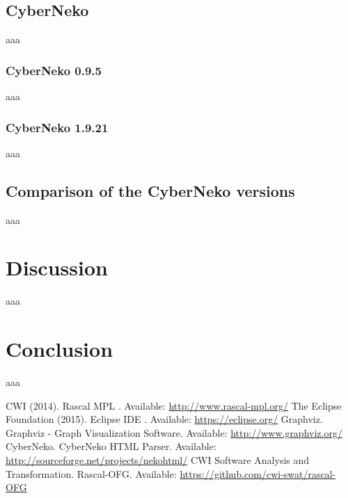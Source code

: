 \documentclass[a4paper,twoside,11pt]{article}
\begin{document}
\subsection{CyberNeko}
\label{sec:cyberneko}
aaa

\subsubsection{CyberNeko 0.9.5}
\label{sec:cyberneko095}
aaa

\subsubsection{CyberNeko 1.9.21}
\label{sec:cyberneko1921}
aaa

\subsection{Comparison of the CyberNeko versions}
\label{sec:comparison}
aaa

\section{Discussion}
\label{sec:discussion}
aaa

\section{Conclusion}
\label{sec:conclusion}
aaa

\begin{thebibliography}{9}
  CWI (2014). Rascal MPL . Available: \url{http://www.rascal-mpl.org/}
  The Eclipse Foundation (2015). Eclipse IDE . Available: \url{https://eclipse.org/}
 Graphviz. Graphviz - Graph Visualization Software. Available: \url{http://www.graphviz.org/}
 CyberNeko. CyberNeko HTML Parser. Available: \url{http://sourceforge.net/projects/nekohtml/}
 CWI Software Analysis and Transformation. Rascal-OFG. Available: \url{https://github.com/cwi-swat/rascal-OFG}

\end{thebibliography}
\end{document}
